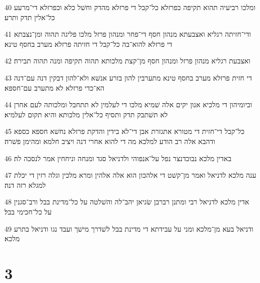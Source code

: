 \par 40 ומלכו רביעיה תהוא תקיפה כפרזלא כל־קבל די פרזלא מהדק וחשׁל כלא וכפרזלא די־מרעע כל־אלין תדק ותרע׃
\par 41 ודי־חזיתה רגליא ואצבעתא מנהון חסף די־פחר ומנהון פרזל מלכו פליגה תהוה ומן־נצבתא די פרזלא להוא־בה כל־קבל די חזיתה פרזלא מערב בחסף טינא׃
\par 42 ואצבעת רגליא מנהון פרזל ומנהון חסף מן־קצת מלכותא תהוה תקיפה ומנה תהוה תבירה׃
\par 43 די חזית פרזלא מערב בחסף טינא מתערבין להון בזרע אנשׁא ולא־להון דבקין דנה עם־דנה הא־כדי פרזלא לא מתערב עם־חספא׃
\par 44 וביומיהון די מלכיא אנון יקים אלה שׁמיא מלכו די לעלמין לא תתחבל ומלכותה לעם אחרן לא תשׁתבק תדק ותסיף כל־אלין מלכותא והיא תקום לעלמיא׃
\par 45 כל־קבל די־חזית די מטורא אתגזרת אבן די־לא בידין והדקת פרזלא נחשׁא חספא כספא ודהבא אלה רב הודע למלכא מה די להוא אחרי דנה ויציב חלמא ומהימן פשׁרה׃
\par 46 באדין מלכא נבוכדנצר נפל על־אנפוהי ולדניאל סגד ומנחה וניחחין אמר לנסכה לה׃
\par 47 ענה מלכא לדניאל ואמר מן־קשׁט די אלהכון הוא אלה אלהין ומרא מלכין וגלה רזין די יכלת למגלא רזה דנה׃
\par 48 אדין מלכא לדניאל רבי ומתנן רברבן שׂגיאן יהב־לה והשׁלטה על כל־מדינת בבל ורב־סגנין על כל־חכימי בבל׃
\par 49 ודניאל בעא מן־מלכא ומני על עבידתא די מדינת בבל לשׁדרך מישׁך ועבד נגו ודניאל בתרע מלכא׃

\chapter{3}


